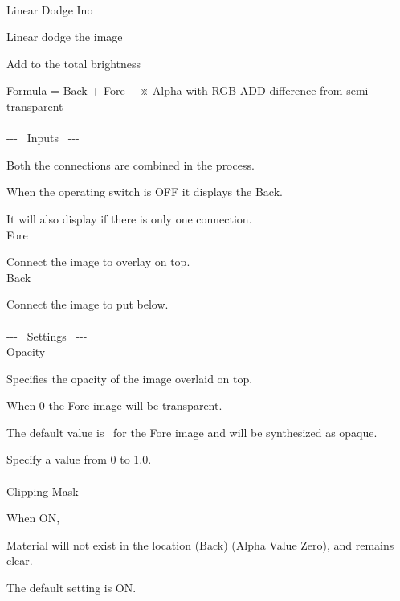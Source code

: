 \documentclass[a4paper,12pt]{article}
\begin{document}
\thispagestyle{empty}

\Large
\noindent \\
Linear Dodge Ino\medskip
\par
\normalsize
Linear dodge the image\par
Add to the total brightness\par
Formula = Back + Fore \ \ ※ Alpha with RGB ADD difference from semi-transparent\\
\\
-{-}- \ Inputs \ -{-}-\par
Both the connections are combined in the process.\par
When the operating switch is OFF it displays the Back.\par
It will also display if there is only one connection.\\
Fore\par
Connect the image to overlay on top.\\
Back\par
Connect the image to put below.\\
\\
-{-}- \ Settings \ -{-}-\\
Opacity\par
Specifies the opacity of the image overlaid on top.\par
When 0 the Fore image will be transparent.\par
The default value is \textquotedbl \ for the Fore image and will be synthesized as opaque.\par
Specify a value from 0 to 1.0.\\
\\
Clipping Mask\par
When ON,\par
Material will not exist in the location (Back) (Alpha Value Zero), and remains clear.\par
The default setting is ON.
\end{document}
